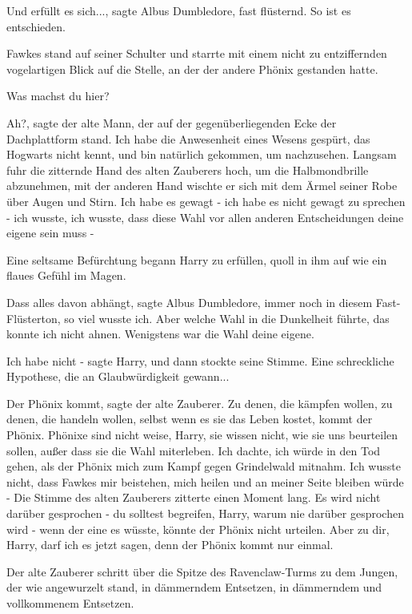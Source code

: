\glqq Und erfüllt es sich...\grqq{}, sagte Albus Dumbledore, fast flüsternd.
\glqq So ist es entschieden.\grqq{}

Fawkes stand auf seiner Schulter und starrte mit einem nicht zu entziffernden
vogelartigen Blick auf die Stelle, an der der andere Phönix gestanden hatte.

\glqq Was machst du hier?\grqq{}

\glqq Ah?\grqq{}, sagte der alte Mann, der auf der gegenüberliegenden Ecke der
Dachplattform stand. \glqq Ich habe die Anwesenheit eines Wesens gespürt, das
Hogwarts nicht kennt, und bin natürlich gekommen, um nachzusehen.\grqq{} Langsam
fuhr die zitternde Hand des alten Zauberers hoch, um die Halbmondbrille
abzunehmen, mit der anderen Hand wischte er sich mit dem Ärmel seiner Robe über
Augen und Stirn. \glqq Ich habe es gewagt - ich habe es nicht gewagt zu sprechen
- ich wusste, ich wusste, dass diese Wahl vor allen anderen Entscheidungen deine
eigene sein muss -\grqq{}

Eine seltsame Befürchtung begann Harry zu erfüllen, quoll in ihm auf wie ein
flaues Gefühl im Magen.

\glqq Dass alles davon abhängt\grqq{}, sagte Albus Dumbledore, immer noch in
diesem Fast-Flüsterton, \glqq so viel wusste ich. Aber welche Wahl in die
Dunkelheit führte, das konnte ich nicht ahnen. Wenigstens war die Wahl deine
eigene.\grqq{}

\glqq Ich habe nicht -\grqq{} sagte Harry, und dann stockte seine Stimme. Eine
schreckliche Hypothese, die an Glaubwürdigkeit gewann...

\glqq Der Phönix kommt\grqq{}, sagte der alte Zauberer. \glqq Zu denen, die
kämpfen wollen, zu denen, die handeln wollen, selbst wenn es sie das Leben
kostet, kommt der Phönix. Phönixe sind nicht weise, Harry, sie wissen nicht, wie
sie uns beurteilen sollen, außer dass sie die Wahl miterleben. Ich dachte, ich
würde in den Tod gehen, als der Phönix mich zum Kampf gegen Grindelwald mitnahm.
Ich wusste nicht, dass Fawkes mir beistehen, mich heilen und an meiner Seite
bleiben würde -\grqq{} Die Stimme des alten Zauberers zitterte einen Moment
lang. \glqq Es wird nicht darüber gesprochen - du solltest begreifen, Harry,
warum nie darüber gesprochen wird - wenn der eine es wüsste, könnte der Phönix
nicht urteilen. Aber zu dir, Harry, darf ich es jetzt sagen, denn der Phönix
kommt nur einmal.\grqq{}

Der alte Zauberer schritt über die Spitze des Ravenclaw-Turms zu dem Jungen, der
wie angewurzelt stand, in dämmerndem Entsetzen, in dämmerndem und vollkommenem
Entsetzen.


